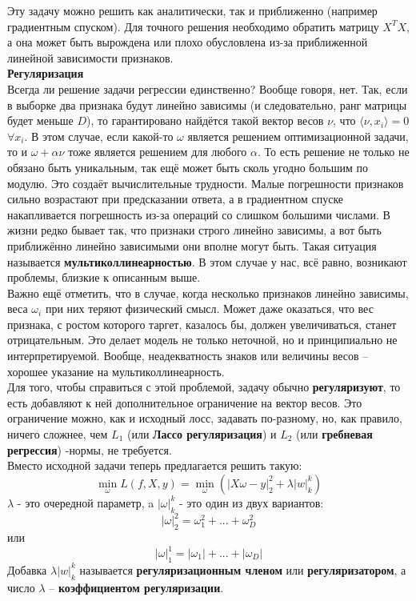 Эту задачу можно решить как аналитически, так и приближенно (например градиентным спуском).
Для точного решения необходимо обратить матрицу $X^TX$, а она может быть вырождена или плохо обусловлена из-за приближенной линейной зависимости признаков. \\

\textbf{Регуляризация} \\
Всегда ли решение задачи регрессии единственно? Вообще говоря, нет. Так, если в выборке два признака будут линейно зависимы (и следовательно, ранг матрицы будет меньше $D$), то гарантировано найдётся такой вектор весов $\nu$, что $\langle\nu,x_i\rangle=0  
 $ $\forall x_i$. В этом случае, если какой-то $\omega$ является решением оптимизационной задачи, то и $\omega+\alpha\nu$ тоже является решением для любого $\alpha$. То есть решение не только не обязано быть уникальным, так ещё может быть сколь угодно большим по модулю. Это создаёт вычислительные трудности. Малые погрешности признаков сильно возрастают при предсказании ответа, а в градиентном спуске накапливается погрешность из-за операций со слишком большими числами. В жизни редко бывает так, что признаки строго линейно зависимы, а вот быть приближённо линейно зависимыми они вполне могут быть. Такая ситуация называется \textbf{мультиколлинеарностью}. В этом случае у нас, всё равно, возникают проблемы, близкие к описанным выше. \\
Важно ещё отметить, что в случае, когда несколько признаков линейно зависимы, веса $\omega_i$ при них теряют физический смысл. Может даже оказаться, что вес признака, с ростом которого таргет, казалось бы, должен увеличиваться, станет отрицательным. Это делает модель не только неточной, но и принципиально не интерпретируемой. Вообще, неадекватность знаков или величины весов – хорошее указание на мультиколлинеарность. \\

Для того, чтобы справиться с этой проблемой, задачу обычно \textbf{регуляризуют}, то есть добавляют к ней дополнительное ограничение на вектор весов. Это ограничение можно, как и исходный лосс, задавать по-разному, но, как правило, ничего сложнее, чем $L_1$ (или \textbf{Лассо регуляризация}) и $L_2$ (или \textbf{гребневая регрессия}) -нормы, не требуется. \\
Вместо исходной задачи теперь предлагается решить такую:
\begin{equation*}
    \min_{\omega}L(f, X, y) = \min_{\omega}(|X\omega-y|_2^2+\lambda|w|_k^k)
\end{equation*}
$\lambda$ - это очередной параметр, a $|\omega|_k^k$ - это один из двух вариантов:
\begin{equation*}
    |\omega|_2^2=\omega_1^2+...+\omega_D^2
\end{equation*}
или
\begin{equation*}
    |\omega|_1^1=|\omega_1|+...+|\omega_D|
\end{equation*}
Добавка $\lambda|w|_k^k$ называется \textbf{регуляризационным членом} или \textbf{регуляризатором}, а число $\lambda$ – \textbf{коэффициентом регуляризации}.

